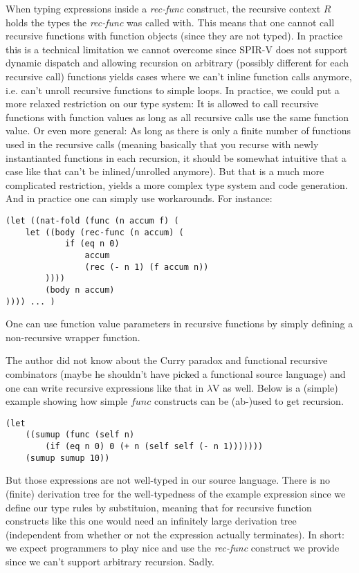 \documentclass[letterpaper,12pt]{article}
\begin{document}
When typing expressions inside a \textit{rec-func} construct, the recursive 
context $R$ holds the types the \textit{rec-func} was called with. This means
that one cannot call recursive functions with function objects (since they
are not typed). In practice
this is a technical limitation we cannot overcome since SPIR-V does not support
dynamic dispatch and allowing recursion on arbitrary (possibly different
for each recursive call) functions yields cases where we can't inline
function calls anymore, i.e. can't unroll recursive functions to simple loops.
In practice, we could put a more relaxed restriction on our type system:
It is allowed to call recursive functions with function values as long
as all recursive calls use the same function value. Or even more general:
As long as there is only a finite number of functions used in the
recursive calls (meaning basically that you recurse with newly
instantianted functions in each recursion, it should be somewhat intuitive
that a case like that can't be inlined/unrolled anymore). But that
is a much more complicated restriction, yields a more complex type system
and code generation. And in practice one can simply use workarounds.
For instance:

\begin{lstlisting}
(let ((nat-fold (func (n accum f) (
	let ((body (rec-func (n accum) (
			if (eq n 0)
				accum
				(rec (- n 1) (f accum n))
		))))
		(body n accum)
)))) ... )
\end{lstlisting}

One can use function value parameters in recursive functions
by simply defining a non-recursive wrapper function.

The author did not know about the Curry paradox and functional
recursive combinators (maybe he shouldn't have picked a functional source language)
and one can write recursive expressions like that in $\lambda$V as well.
Below is a (simple) example showing how simple $func$ constructs can
be (ab-)used to get recursion.

\begin{lstlisting}
(let 
	((sumup (func (self n) 
		(if (eq n 0) 0 (+ n (self self (- n 1)))))))
	(sumup sumup 10))
\end{lstlisting}

But those expressions are not well-typed in our source language.
There is no (finite) derivation tree
for the well-typedness of the example expression since we define our
type rules by substituion, meaning that for recursive function constructs
like this one would need an infinitely large derivation tree (independent
from whether or not the expression actually terminates).
In short: we expect programmers to play nice and use the \textit{rec-func}
construct we provide since we can't support arbitrary recursion. Sadly.
\end{document}
